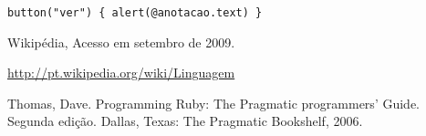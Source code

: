 \documentclass[12pt]{article}
\begin{document}
\begin{lstlisting}[caption=Entendendo a linha de edição]
button("ver") { alert(@anotacao.text) } 
\end{lstlisting}



\begin{thebibliography}{9} 
Wikipédia, 
Acesso em setembro de 2009.

\url{http://pt.wikipedia.org/wiki/Linguagem}

Thomas, Dave. 
Programming Ruby: The Pragmatic programmers’ Guide. 
Segunda edição. Dallas, Texas: The Pragmatic Bookshelf, 2006.



\end{thebibliography} 
\end{document}
